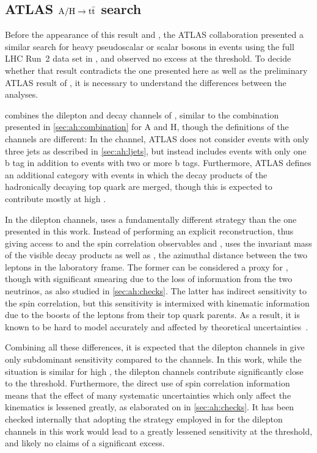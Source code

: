 \subsection{ATLAS \texorpdfstring{$\mathrm{A/H} \rightarrow \mathrm{t \bar{t}}$}{A/H -> tt} search}

Before the appearance of this result and , the ATLAS collaboration presented a similar search for heavy pseudoscalar or scalar bosons in \ttbar events using the full LHC Run~2 data set in , and observed no excess at the \ttbar threshold. To decide whether that result contradicts the one presented here as well as the preliminary ATLAS result of , it is necessary to understand the differences between the analyses.

 combines the dilepton and \ljets decay channels of \ttbar, similar to the combination presented in \cref{sec:ah:combination} for A and H, though the definitions of the channels are different: In the \ljets channel, ATLAS does not consider events with only three jets as described in \cref{sec:ah:ljets}, but instead includes events with only one b tag in addition to events with two or more b tags. Furthermore, ATLAS defines an additional category with \ljets events in which the decay products of the hadronically decaying top quark are merged, though this is expected to contribute mostly at high \mtt.

In the dilepton channels,  uses a fundamentally different strategy than the one presented in this work. Instead of performing an explicit \ttbar reconstruction, thus giving access to \mtt and the spin correlation observables \chel and \chan,  uses the invariant mass \mbbll of the visible decay products as well as \dphill, the azimuthal distance between the two leptons in the laboratory frame. The former can be considered a proxy for \mtt, though with significant smearing due to the loss of information from the two neutrinos, as also studied in \cref{sec:ah:checks}. The latter has indirect sensitivity to the \ttbar spin correlation, but this sensitivity is intermixed with kinematic information due to the boosts of the leptons from their top quark parents. As a result, it is known to be hard to model accurately and affected by theoretical uncertainties~\cite{CMS:TOP-18-006,ATLAS:2019hau}.

Combining all these differences, it is expected that the dilepton channels in  give only subdominant sensitivity compared to the \ljets channels. In this work, while the situation is similar for high \mtt, the dilepton channels contribute significantly close to the \ttbar threshold. Furthermore, the direct use of spin correlation information means that the effect of many systematic uncertainties which only affect the kinematics is lessened greatly, as elaborated on in \cref{sec:ah:checks}. It has been checked internally that adopting the strategy employed in  for the dilepton channels in this work would lead to a greatly lessened sensitivity at the \ttbar threshold, and likely no claims of a significant excess.

